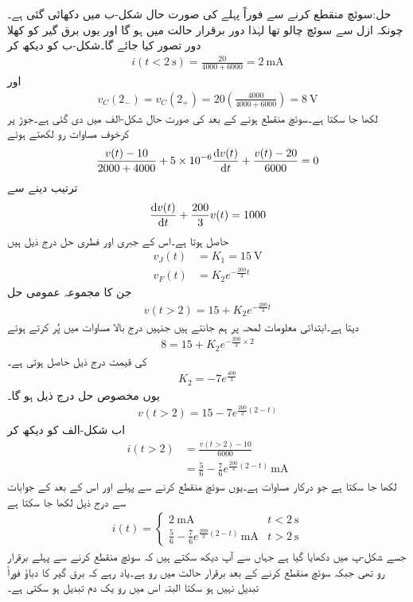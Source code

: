 حل:سوئچ منقطع کرنے سے فوراً پہلے کی صورت حال شکل-ب میں دکھائی گئی ہے۔چونکہ ازل سے سوئچ چالو تھا لہٰذا دور برقرار حالت میں ہو گا اور یوں برق گیر کو کھلا دور تصور کیا جائے گا۔شکل-ب کو دیکھ کر
\begin{align*}
i(t<\SI{2}{\second})=\frac{20}{4000+6000}=\SI{2}{\milli\ampere}
\end{align*}
اور
\begin{align*}
v_C(2_-)=v_C(2_+)=20\left(\frac{4000}{4000+6000}\right)=\SI{8}{\volt}
\end{align*}
لکھا جا سکتا ہے۔سوئچ منقطع ہونے کے بعد کی صورت حال شکل-الف میں دی گئی ہے۔جوڑ  پر کرخوف مساوات رو لکھتے ہوئے
\begin{align*}
\frac{v(t)-10}{2000+4000}+5\times 10^{-6}\frac{\dif v(t)}{\dif t}+\frac{v(t)-20}{6000}=0
\end{align*}
ترتیب دینے سے
\begin{align*}
\frac{\dif v(t)}{\dif t}+\frac{200}{3} v(t)=1000
\end{align*}
حاصل ہوتا ہے۔اس کے جبری اور فطری  حل درج ذیل ہیں
\begin{align*}
v_J(t)&=K_1=\SI{15}{\volt}\\
v_F(t)&=K_2e^{-\frac{200}{3}t}
\end{align*}
جن کا مجموعہ عمومی حل
\begin{align*}
v(t>2)=15+K_2e^{-\frac{200}{3}t}
\end{align*}
 دیتا ہے۔ابتدائی معلومات  لمحہ  پر ہم جانتے ہیں جنہیں درج بالا مساوات میں پُر کرتے ہوئے
\begin{align*}
8=15+K_2e^{-\frac{200}{3}\times 2}
\end{align*}
 کی قیمت درج ذیل حاصل ہوتی ہے۔
\begin{align*}
K_2=-7e^{\frac{400}{3}}
\end{align*}
یوں مخصوص حل درج ذیل ہو گا۔
\begin{align*}
v(t>2)=15-7e^{\frac{200}{3}(2-t)}
\end{align*}
اب شکل-الف کو دیکھ کر
\begin{align*}
i(t>2)&=\frac{v(t>2)-10}{6000}\\
&=\frac{5}{6}-\frac{7}{6} e^{\frac{200}{3}(2-t)} \, \si{\milli\ampere}
\end{align*}
لکھا جا سکتا ہے جو درکار مساوات ہے۔یوں سوئچ منقطع کرنے سے پہلے اور اس کے بعد کے جوابات سے درج ذیل لکھا جا سکتا ہے
\begin{align*}
i(t)=
\begin{cases}
\SI{2}{\milli\ampere} & t<\SI{2}{\second}\\
\frac{5}{6}-\frac{7}{6} e^{\frac{200}{3}(2-t)} \, \si{\milli\ampere} & t>\SI{2}{\second}
\end{cases}
\end{align*}
جسے شکل-پ میں دکھایا گیا ہے جہاں سے آپ دیکھ سکتے ہیں کہ سوئچ منقطع کرنے سے پہلے برقرار رو  تھی جبکہ سوئچ منقطع کرنے کے بعد برقرار حالت  میں رو  ہے۔یاد رہے کہ برق گیر کا دباؤ فوراً تبدیل نہیں ہو سکتا البتہ اس میں رو یک دم تبدیل ہو سکتی ہے۔

